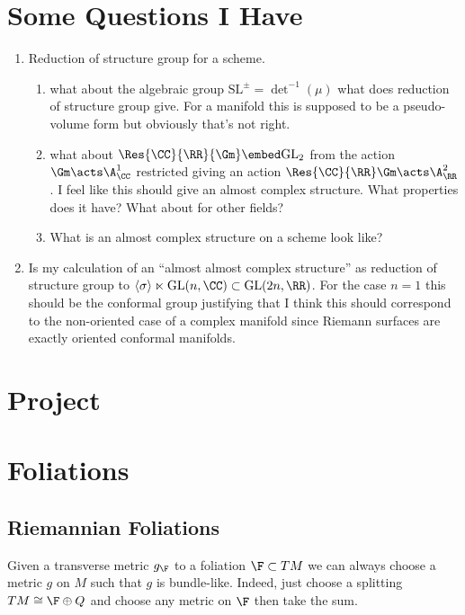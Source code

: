 \documentclass[12pt]{article}
\begin{document}
\section{Some Questions I Have}

\begin{enumerate}
\item Reduction of structure group for a scheme.
\begin{enumerate}
\item what about the algebraic group $\mathrm{SL}^{\pm} = \det^{-1}(\mu)$ what does reduction of structure group give. For a manifold this is supposed to be a pseudo-volume form but obviously that's not right.
\item what about $\Res{\CC}{\RR}{\Gm} \embed \mathrm{GL}_2$ from the action $\Gm \acts \A^1_{\CC}$ restricted giving an action $\Res{\CC}{\RR} \Gm \acts \A^2_{\RR}$. I feel like this should give an almost complex structure. What properties does it have? What about for other fields?
\item What is an almost complex structure on a scheme look like?
\end{enumerate}
\item Is my calculation of an ``almost almost complex structure'' as reduction of structure group to $\left< \sigma \right> \ltimes \mathrm{GL}(n, \CC) \subset \mathrm{GL}(2n, \RR)$. For the case $n = 1$ this should be the conformal group justifying that I think this should correspond to the non-oriented case of a complex manifold since Riemann surfaces are exactly oriented conformal manifolds.
\end{enumerate}


\section{Project}

\section{Foliations}

\subsection{Riemannian Foliations}

\begin{rmk}
Given a transverse metric $g_\F$ to a foliation $\F \subset T M$ we can always choose a metric $g$ on $M$ such that $g$ is bundle-like. Indeed, just choose a splitting $T M \cong \F \oplus Q$ and choose any metric on $\F$ then take the sum. 
\end{rmk}
\end{document}
